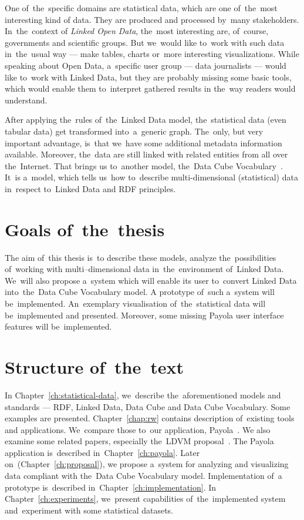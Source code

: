 One of~the~specific domains are statistical data, which are one of~the~most interesting kind
of data. They are produced and processed by~many stakeholders. In~the~context of
\emph{Linked Open Data}, the~most interesting are, of~course, governments and scientific groups.
But we~would like to~work with such data in~the~usual
way --- make tables, charts or~more interesting visualizations. While speaking about Open Data, a~specific
user group --- data journalists --- would like to~work with Linked Data, but they are probably
missing some basic tools, which would enable them to~interpret gathered results
in the~way readers would understand.

After applying the~rules of~the~Linked Data model, the~statistical data (even tabular data)
get transformed into~a~generic graph. The~only, but very important advantage, is~that we~have some additional
metadata information available. Moreover, the~data are still linked with related entities from all over the~Internet.
That brings
us to~another model, the~Data Cube Vocabulary~\cite{dcv}. It~is a~model, which tells us~how to~describe
multi-dimensional (statistical) data in~respect to~Linked Data and RDF 
principles.

\section*{Goals of~the~thesis}

The aim of~this thesis is~to describe these models, analyze the~possibilities of~working
with multi--dimensional data in~the~environment of~Linked Data. We~will also propose a~system
which will enable its user to~convert Linked Data into~the~Data Cube Vocabulary model.
A prototype of~such a~system will be~implemented. An~exemplary visualisation of~the~statistical
data will be~implemented and presented. Moreover, some missing Payola user interface features 
will be~implemented.

\section*{Structure of~the~text}
In Chapter~\ref{ch:statistical-data}, we~describe the~aforementioned 
models and standards --- RDF, Linked Data, Data Cube and Data Cube Vocabulary. 
Some examples are presented. Chapter~\ref{chap:rw} contains description of~existing tools and applications. We~compare those to~our application, Payola~\cite{payola}.
We also examine some related papers, especially the~LDVM proposal~\cite{ldvm}. 
The Payola application is~described in~Chapter~\ref{ch:payola}. Later on~(Chapter~\ref{ch:proposal}),
we propose a~system
for analyzing and visualizing data compliant with the~Data Cube Vocabulary model.
Implementation of~a prototype is~described in~Chapter~\ref{ch:implementation}.
In Chapter~\ref{ch:experiments}, we~present capabilities of~the~implemented system
and~experiment with some statistical datasets.